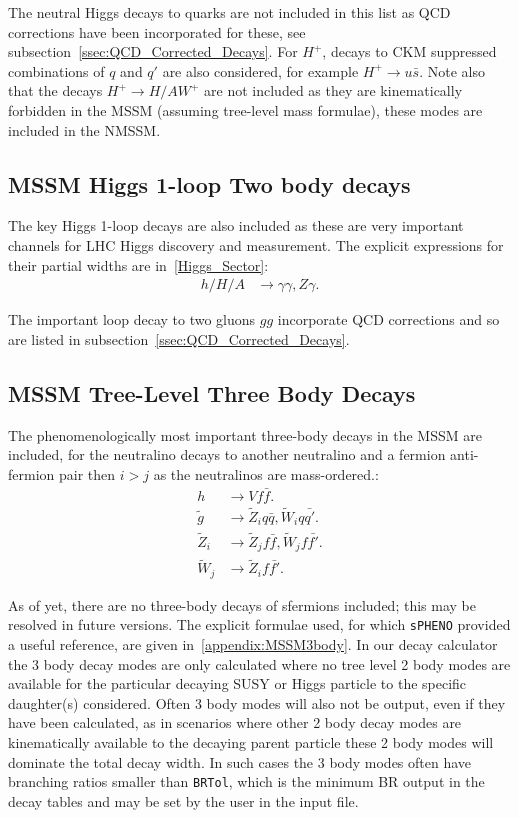 \documentclass[final,3p,times,pdflatex]{elsarticle}
\begin{document}
The neutral Higgs decays to quarks are not included in this list as QCD corrections have been incorporated for these, see subsection~\ref{ssec:QCD_Corrected_Decays}.
For $H^+$, decays to CKM suppressed combinations of $q$ and $q'$ are also considered, for example $H^+ \rightarrow u \bar{s}$. Note also that the decays $H^+ \rightarrow H/A W^+$ are not included as they are kinematically forbidden in the MSSM (assuming tree-level mass formulae), these modes are included in the NMSSM.

\subsection{MSSM Higgs 1-loop Two body decays}
The key Higgs 1-loop decays are also included as these are very important 
channels for LHC Higgs discovery and measurement. The explicit expressions for
their partial widths are in~\ref{Higgs_Sector}:
\begin{align*}
h/H/A &\rightarrow \gamma\gamma, Z\gamma.
\end{align*}

The important loop decay to two gluons $gg$ incorporate QCD corrections and so are listed in  subsection~\ref{ssec:QCD_Corrected_Decays}.

\subsection{MSSM Tree-Level Three Body Decays}
The phenomenologically most important three-body decays in the MSSM are included, for the neutralino decays to another neutralino and a fermion anti-fermion pair then $i>j$ as the neutralinos are mass-ordered.:
\begin{align*}
h &\rightarrow V f \bar{f}. \\
\tilde{g} &\rightarrow \tilde{Z}_i q \bar{q}, \tilde{W}_i q \bar{q'}. \\
\tilde{Z}_{i} &\rightarrow \tilde{Z}_j f \bar{f}, \tilde{W}_j f \bar{f'}. \\
\tilde{W}_{j} &\rightarrow \tilde{Z}_i f \bar{f'}.
\end{align*}

As of yet, there are no three-body decays of sfermions included; this may be
resolved in future versions. The explicit formulae used, for which {\tt sPHENO}
\cite{Porod:2003um} provided a useful reference, are given in~\ref{appendix:MSSM3body}. In our decay calculator the 3 body decay modes
are only calculated where no tree level 2 body modes are available for the particular
decaying SUSY or Higgs particle to the specific daughter(s) considered. Often
3 body modes will also not be output, even if they have been calculated,
as in scenarios where other 2 body decay modes are kinematically available
to the decaying parent particle these 2 body modes will dominate the total
decay width. In such cases the 3 body modes often have branching ratios
smaller than {\tt BRTol}, which is the minimum BR output in the decay tables and may be
set by the user in the input file. 
\end{document}
